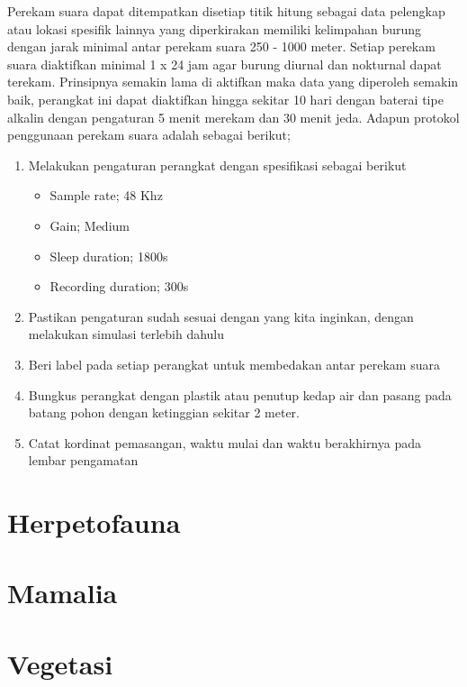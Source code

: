 \documentclass[
]{book}
\providecommand{\tightlist}{%
  \setlength{\itemsep}{0pt}\setlength{\parskip}{0pt}}
\begin{document}
Perekam suara dapat ditempatkan disetiap titik hitung sebagai data pelengkap atau lokasi spesifik lainnya yang diperkirakan memiliki kelimpahan burung dengan jarak minimal antar perekam suara 250 - 1000 meter. Setiap perekam suara diaktifkan minimal 1 x 24 jam agar burung diurnal dan nokturnal dapat terekam. Prinsipnya semakin lama di aktifkan maka data yang diperoleh semakin baik, perangkat ini dapat diaktifkan hingga sekitar 10 hari dengan baterai tipe alkalin dengan pengaturan 5 menit merekam dan 30 menit jeda. Adapun protokol penggunaan perekam suara adalah sebagai berikut;

\begin{enumerate}
\def\labelenumi{\arabic{enumi}.}
\item
  Melakukan pengaturan perangkat dengan spesifikasi sebagai berikut

  \begin{itemize}
  \tightlist
  \item
    Sample rate; 48 Khz
  \item
    Gain; Medium
  \item
    Sleep duration; 1800s
  \item
    Recording duration; 300s
  \end{itemize}
\item
  Pastikan pengaturan sudah sesuai dengan yang kita inginkan, dengan melakukan simulasi terlebih dahulu
\item
  Beri label pada setiap perangkat untuk membedakan antar perekam suara
\item
  Bungkus perangkat dengan plastik atau penutup kedap air dan pasang pada batang pohon dengan ketinggian sekitar 2 meter.
\item
  Catat kordinat pemasangan, waktu mulai dan waktu berakhirnya pada lembar pengamatan
\end{enumerate}

\hypertarget{herpetofauna}{%
\section*{Herpetofauna}\label{herpetofauna}}

\hypertarget{mamalia}{%
\section*{Mamalia}\label{mamalia}}

\hypertarget{vegetasi}{%
\section*{Vegetasi}\label{vegetasi}}
\end{document}
